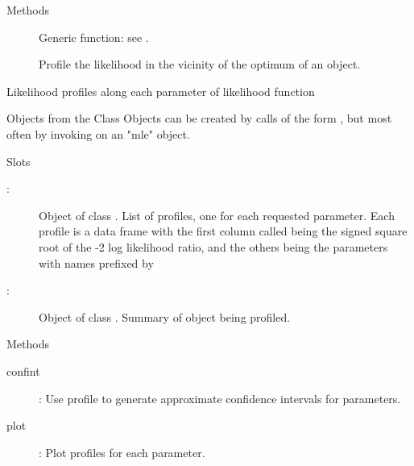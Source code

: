 %
\begin{Section}{Methods}
\begin{description}

\item[] Generic function: see
.
\item[] Profile the likelihood in
the vicinity of the optimum of an  object.

\end{description}

\end{Section}
%
\begin{Description}\relax
Likelihood profiles along each parameter of likelihood function
\end{Description}
%
\begin{Section}{Objects from the Class}
Objects can be created by calls of the form , but most often by invoking  on an "mle" object.
\end{Section}
%
\begin{Section}{Slots}
\begin{description}

\item[:] Object of class . List of
profiles, one for each requested parameter. Each profile is a data
frame with the first column called  being the signed square
root of the -2 log likelihood ratio, and the others being the
parameters with names prefixed by 
\item[:] Object of class . Summary
of object being profiled.

\end{description}

\end{Section}
%
\begin{Section}{Methods}
\begin{description}

\item[confint] : Use profile
to generate approximate confidence intervals for parameters.
\item[plot] : Plot
profiles for each parameter.

\end{description}

\end{Section}
